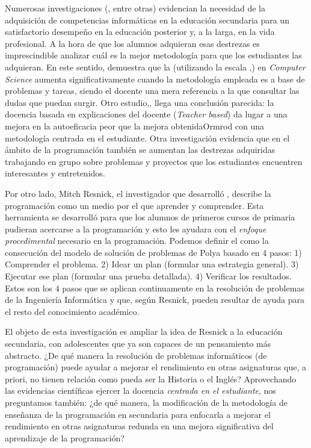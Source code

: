 \documentclass[palatino,miniheader]{apuntesURJC}
\begin{document}
Numerosas investigaciones (\cite{CSIsImportant},\cite{CSArguing} entre otras) evidencian la necesidad de la adquisición de competencias informáticas en la educación secundaria para un satisfactorio desempeño en la educación posterior y, a la larga, en la vida profesional.
%
A la hora de que los alumnos adquieran esas destrezas es imprescindible analizar cuál es la mejor metodología para que los estudiantes las adquieran.
%
En este sentido, \cite{StudentCenter} demuestra que la  (utilizando la escala ,\cite{CPSES}) en \textit{Computer Science} aumenta significativamente cuando la metodología empleada es a base de problemas y tareas, siendo el docente una mera referencia a la que consultar las dudas que puedan surgir.
%
\label{studentbased}
%
Otro estudio,\cite{StudentCenterVSLectures}, llega una conclusión parecida:
%
la docencia basada en explicaciones del docente (\textit{Teacher based}) da lugar a una mejora en la autoeficacia peor que la mejora obtenidaOrmrod con una metodología centrada en el estudiante.
%
\label{groupsbased}
%
Otra investigación \cite{ABPCS} evidencia que en el ámbito de la programación también se aumentan las destrezas adquiridas trabajando en grupo sobre problemas y proyectos que los estudiantes encuentren interesantes y entretenidos. 


Por otro lado, Mitch Resnick, el investigador que desarrolló  \cite{scratch}, describe la programación como un medio por el que aprender y comprender.
%
Esta herramienta se desarrolló para que los alumnos de primeros cursos de primaria pudieran acercarse a la programación y esto les ayudara con el \textit{enfoque procedimental} necesario en la programación.
%
Podemos definir el  como la consecución del modelo de solución de problemas de Polya \cite{Polya} basado en 4 pasos:
1) Comprender el problema. 2) Idear un plan (formular una estrategia general). 3) Ejecutar ese plan (formular una prueba detallada). 4) Verificar los resultados. 
%
Estos son los 4 pasos que se aplican continuamente en la resolución de problemas de la Ingeniería Informática y que, según Resnick, pueden resultar de ayuda para el resto del conocimiento académico.

El objeto de esta investigación es ampliar la idea de Resnick a la educación secundaria, con adolescentes que ya son capaces de un pensamiento más abstracto.
%
¿De qué manera la resolución de problemas informáticos (de programación) puede ayudar a mejorar el rendimiento en otras asignaturas que, a priori, no tienen relación como pueda ser la Historia o el Inglés?
%
Aprovechando las evidencias científicas ejercer la docencia \textit{centrada en el estudiante}, nos preguntamos también:
%
¿de qué manera, la modificación de la metodología de enseñanza de la programación en secundaria para enfocarla a mejorar el rendimiento en otras asignaturas redunda en una mejora significativa del aprendizaje de la programación?
\end{document}

